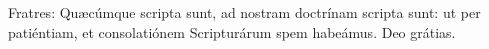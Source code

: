 Fratres: Quæcúmque scripta sunt, ad nostram doctrínam scripta sunt: ut per patiéntiam, et consolatiónem Scripturárum spem habeámus. \rubric{\Rbar} Deo grátias.
